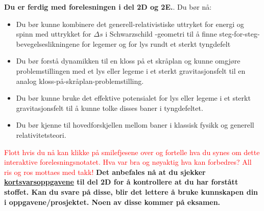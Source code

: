 \documentclass{beamer}
\let\hrefori\href
\renewcommand{\href}[2]{{\setlength{\fboxsep}{1pt}\colorbox{sunset}{\hrefori{#1}{#2}}}}
\renewcommand{\ss}{Schwarz\-schild }
\newcommand{\pagebutton}[1]{\setbeamertemplate{button}{\tikz\node[inner xsep = 5pt, draw = structure!90, fill = green(ryb), rounded corners = 8pt]{\color{amber}\Large\insertbuttontext};}\beamerbutton{#1}}
\begin{document}
\begin{frame}
\label{oppsummering}
\hyperlink{feil_skra49}{\pagebutton{\small Forrige side}}\href{https://nettskjema.no/a/173961}{ \Changey[1][yellow]{-2}}
{\bf Du er ferdig med forelesningen i del 2D og 2E.}. Du bør nå:
\begin{itemize}
\item Du bør kunne kombinere det generell-relativistiske uttryket for energi og spinn med uttrykket for $\Delta s$ i \ss-geometri til å finne steg-for-steg-bevegelseslikningene for legemer og for lys rundt et sterkt tyngdefelt
\item Du bør forstå dynamikken til en kloss på et skråplan og kunne omgjøre problemstillingen med et lys eller legeme i et sterkt gravitasjonsfelt til en analog kloss-på-skråplan-problemstilling.
\item Du bør kunne bruke det effektive potensialet for lys eller legeme i et sterkt gravitasjonsfelt til å kunne tolke disses baner i tyngdefeltet.
\item Du bør kjenne til hovedforskjellen mellom baner i klassisk fysikk og generell relativitetsteori.
\end{itemize}
\textcolor{red}{Flott hvis du nå kan klikke på smilefjesene over og fortelle hva du synes om dette interaktive forelesningsnotatet. Hva var bra og nøyaktig hva kan forbedres? All ris og ros mottaes med takk!}
{\bf Det anbefales nå at du sjekker \href{https://www.uio.no/studier/emner/matnat/astro/AST2000/h21/undervisningsmateriell/kortsvarsoppgaver/del2d.pdf}{kortsvarsoppgavene} til del 2D for å kontrollere at du har forstått stoffet. Kan du svare på disse, blir det lettere å bruke kunnskapen din i oppgavene/prosjektet. Noen av disse kommer på eksamen.}
\end{frame}
\end{document}
